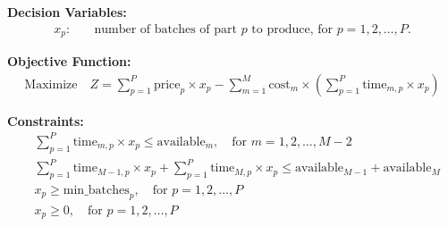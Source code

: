 \documentclass{article}
\begin{document}
\textbf{Decision Variables:}
\begin{align*}
x_p : & \quad \text{number of batches of part } p \text{ to produce, for } p = 1, 2, \ldots, P.
\end{align*}

\textbf{Objective Function:}
\begin{align*}
\text{Maximize} \quad Z = \sum_{p=1}^{P} \text{price}_p \times x_p - \sum_{m=1}^{M} \text{cost}_m \times \left(\sum_{p=1}^{P} \text{time}_{m,p} \times x_p\right)
\end{align*}

\textbf{Constraints:}
\begin{align*}
& \sum_{p=1}^{P} \text{time}_{m,p} \times x_p \leq \text{available}_m, \quad \text{for } m = 1, 2, \ldots, M-2 \\
& \sum_{p=1}^{P} \text{time}_{M-1,p} \times x_p + \sum_{p=1}^{P} \text{time}_{M,p} \times x_p \leq \text{available}_{M-1} + \text{available}_M \\
& x_p \geq \text{min\_batches}_p, \quad \text{for } p = 1, 2, \ldots, P \\
& x_p \geq 0, \quad \text{for } p = 1, 2, \ldots, P
\end{align*}
\end{document}
